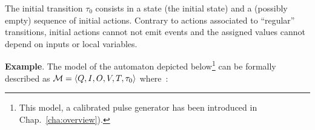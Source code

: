 \medskip The initial transition $\tau_0$ consists in a state (the initial state) and a (possibly
empty) sequence of initial actions. Contrary to actions associated to ``regular'' transitions,
initial actions cannot not emit events and the
assigned values cannot depend on inputs or local variables.
  



\medskip \textbf{Example}. The model of the automaton depicted below\footnote{This model, a
  calibrated pulse generator has been introduced in Chap.~\ref{cha:overview}).}
can be formally described as $\mathcal{M}=\langle Q, I, O, V, T, \tau_0\rangle$ where~:

